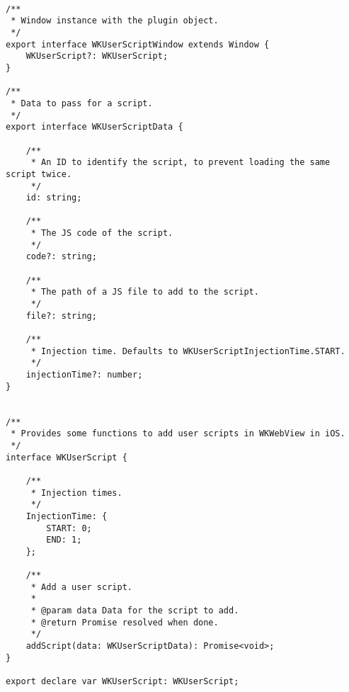 \begin{lstlisting}[frame=single, label ={index.d.ts}, caption = Perubahan pada \texttt{node\_ modules/cordova-plugin-wkuserscript/types/index.d.ts} ]
	
/**
 * Window instance with the plugin object.
 */
export interface WKUserScriptWindow extends Window {
    WKUserScript?: WKUserScript;
}

/**
 * Data to pass for a script.
 */
export interface WKUserScriptData {

    /**
     * An ID to identify the script, to prevent loading the same script twice.
     */
    id: string;

    /**
     * The JS code of the script.
     */
    code?: string;

    /**
     * The path of a JS file to add to the script.
     */
    file?: string;

    /**
     * Injection time. Defaults to WKUserScriptInjectionTime.START.
     */
    injectionTime?: number;
}


/**
 * Provides some functions to add user scripts in WKWebView in iOS.
 */
interface WKUserScript {

    /**
     * Injection times.
     */
    InjectionTime: {
        START: 0;
        END: 1;
    };

    /**
     * Add a user script.
     *
     * @param data Data for the script to add.
     * @return Promise resolved when done.
     */
    addScript(data: WKUserScriptData): Promise<void>;
}

export declare var WKUserScript: WKUserScript;

\end{lstlisting}
